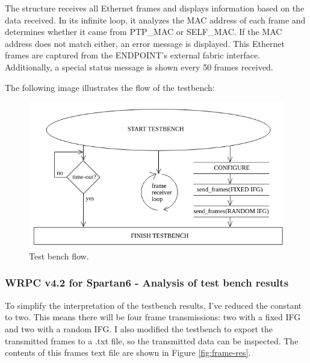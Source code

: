 \noindent The  structure receives all Ethernet frames and displays information based on the data received.
In its infinite loop, it analyzes the MAC address of each frame and determines whether it came from PTP\_MAC or SELF\_MAC.
If the MAC address does not match either, an error message is displayed.
This Ethernet frames are captured from the ENDPOINT’s external fabric interface. 
Additionally, a special status message is shown every 50 frames received.

\vspace{5mm}

\noindent The following image illustrates the flow of the testbench:

\begin{figure}[H]
\centering
\includegraphics[width=14cm]{figures/tb_flow.png}
\caption{Test bench flow.}
\label{fig:tb-flow}
\end{figure}

\newpage 

\subsubsection{WRPC v4.2 for Spartan6 - Analysis of test bench results}

\noindent To simplify the interpretation of the testbench results, I’ve reduced the  constant to two.
This means there will be four frame transmissions: two with a fixed IFG and two with a random IFG.
I also modified the testbench to export the transmitted frames to a .txt file, so the transmitted data can be inspected.
The contents of this frames text file are shown in Figure \ref{fig:frame-res}.

